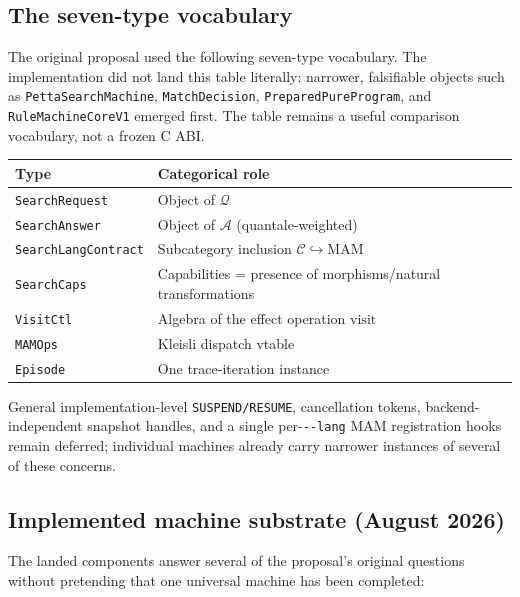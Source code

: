 \documentclass[11pt]{article}
\newcommand{\code}[1]{\texttt{#1}}
\begin{document}
\subsection{The seven-type vocabulary}

The original proposal used the following seven-type vocabulary.  The
implementation did not land this table literally: narrower, falsifiable
objects such as \code{PettaSearchMachine}, \code{MatchDecision},
\code{PreparedPureProgram}, and \code{RuleMachineCoreV1} emerged first.
The table remains a useful comparison vocabulary, not a frozen C ABI.

\begin{center}
\begin{tabular}{ll}
\toprule
\textbf{Type} & \textbf{Categorical role} \\
\midrule
\code{SearchRequest} & Object of $\mathcal{Q}$ \\
\code{SearchAnswer} & Object of $\mathcal{A}$ (quantale-weighted) \\
\code{SearchLangContract} & Subcategory inclusion $\mathcal{C} \hookrightarrow \mathrm{MAM}$ \\
\code{SearchCaps} & Capabilities = presence of morphisms/natural transformations \\
\code{VisitCtl} & Algebra of the effect operation $\mathrm{visit}$ \\
\code{MAMOps} & Kleisli dispatch vtable \\
\code{Episode} & One trace-iteration instance \\
\bottomrule
\end{tabular}
\end{center}

General implementation-level \code{SUSPEND/RESUME}, cancellation tokens,
backend-independent snapshot handles, and a single per-\code{-{}-lang} MAM
registration hooks remain deferred; individual machines already carry
narrower instances of several of these concerns.

\subsection{Implemented machine substrate (August 2026)}

The landed components answer several of the proposal's original questions
without pretending that one universal machine has been completed:
\end{document}
